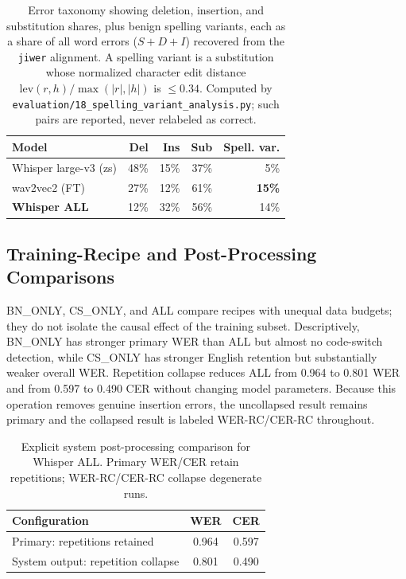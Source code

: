 \documentclass[journal]{IEEEtran}
\newcommand{\best}[1]{\textbf{#1}}
\begin{document}
\begin{table}[t]
\caption{Error taxonomy showing deletion, insertion, and substitution shares,
plus benign spelling variants, each as a share of all word errors ($S+D+I$)
recovered from the \texttt{jiwer} alignment. A spelling variant is a
substitution whose normalized character edit distance
$\mathrm{lev}(r,h)/\max(|r|,|h|)$ is $\le 0.34$. Computed by
\texttt{evaluation/18\_spelling\_variant\_analysis.py}; such pairs are reported,
never relabeled as correct.}
\label{tab:taxonomy}
\centering\footnotesize
\begin{tabular}{@{}lrrrr@{}}
\toprule
\textbf{Model} & \textbf{Del} & \textbf{Ins} & \textbf{Sub} & \textbf{Spell. var.} \\
\midrule
Whisper large-v3 (zs)   & 48\% & 15\% & 37\% & 5\% \\
wav2vec2 (FT)           & 27\% & 12\% & 61\% & \best{15\%} \\
\best{Whisper ALL} & 12\% & 32\% & 56\% & 14\% \\
\bottomrule
\end{tabular}
\end{table}

\subsection{Training-Recipe and Post-Processing Comparisons}
BN\_ONLY, CS\_ONLY, and ALL compare recipes with unequal data budgets; they do
not isolate the causal effect of the training subset. Descriptively, BN\_ONLY
has stronger primary WER than ALL but almost no code-switch detection, while
CS\_ONLY has stronger English retention but substantially weaker overall WER.
Repetition collapse reduces ALL from 0.964 to 0.801 WER and from 0.597 to
0.490 CER without changing model parameters. Because this operation removes
genuine insertion errors, the uncollapsed result remains primary and the
collapsed result is labeled WER-RC/CER-RC throughout.


\begin{table}[t]
\caption{Explicit system post-processing comparison for Whisper ALL. Primary
WER/CER retain repetitions; WER-RC/CER-RC collapse degenerate runs.}
\label{tab:ablnorm}
\centering\small
\begin{tabular}{lcc}
\toprule
\textbf{Configuration} & \textbf{WER} & \textbf{CER} \\
\midrule
Primary: repetitions retained & 0.964 & 0.597 \\
System output: repetition collapse & 0.801 & 0.490 \\
\bottomrule
\end{tabular}
\end{table}
\end{document}
